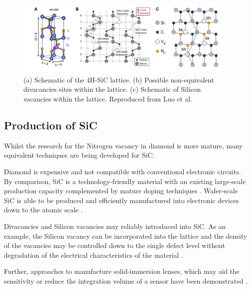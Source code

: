 \begin{figure}[H]
    \begin{center}
        \includegraphics[width=\textwidth]{figures/SiC-lattice.pdf}
    \end{center}
    \caption{(a) Schematic of the 4H-SiC lattice. (b) Possible non-equivalent divacancies sites within the lattice. (c) Schematic of Silicon vacancies within the lattice. Reproduced from Luo et al.}\label{fig:SiC_defects}
\end{figure}



\subsection{Production of SiC}
Whilst the research for the Nitrogen vacancy in diamond is more mature, many equivalent techniques are being developed for 
SiC. 

Diamond is expensive and not compatible with conventional electronic circuits. By comparison, SiC is a technology-friendly material with an existing large-scale production capacity complemented by mature doping techniques \cite{Jiang2023}. Wafer-scale SiC is able to be produced and efficiently manufactured into electronic devices down to the atomic scale \cite{arxiv.1503.07566}.

Divacancies and Silicon vacancies may reliably introduced into SiC. As an example, the Silicon vacancy can be incorporated into the lattice and the density of the vacancies may be controlled down to the single defect level without degradation of the electrical characteristics of the material
\cite{Ohshima2018,PhysRevApplied.4.014009,Wang2019}
.

Further, approaches to manufacture solid-immersion lenses, which may aid the sensitivity or reduce the integration volume of a sensor have been demonstrated
\cite{Sardi2020}
.

